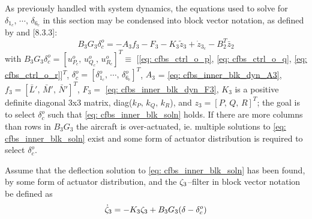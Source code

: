 \documentclass[12pt]{ucthesis}
\begin{document}
As previously handled with system dynamics, the equations used to solve for $\delta_{1_c},\,\cdots,\,\delta_{6_c}$ in this section may be condensed into block vector notation, as defined by \citet{Farrell2005} and \citet{Farrell2006}[8.3.3]:%
	\begin{equation} \label{eq: cfbs_inner_blk_soln}%
		B_3 G_3 \delta^o_{c} = -A_3 f_3 -F_3 -K_3{\tilde{z}_3} + \dot{z}_{3_c} - B^T_2\bar{z}_2
	\end{equation}
with $B_3 G_3 \delta^o_{c} = [u^{o}_{P_c},\,u^{o}_{Q_c},\,u^{o}_{R_c}]^T \equiv $ [\ref{eq: cfbs_ctrl_o_p}, \ref{eq: cfbs_ctrl_o_q}, \ref{eq: cfbs_ctrl_o_r}]$^T$, $\delta^o_{c} = [\delta^o_{1_c},\,\cdots,\,\delta^o_{6_c}]^T$, $A_3$ = \autoref{eq: cfbs_inner_blk_dyn_A3}, $f_3 = [\bar{L}',\,\bar{M}',\,\bar{N}']^T$, $F_3 =$ \autoref{eq: cfbs_inner_blk_dyn_F3}, $K_3$ is a positive definite diagonal 3x3 matrix, diag($k_P,\,k_Q,\,k_R$), and $z_3 = [P,\,Q,\,R]^T$; the goal is to select  $\delta^o_{c}$ such that \autoref{eq: cfbs_inner_blk_soln} holds. If there are more columns than rows in $B_3 G_3$ the aircraft is over-actuated, ie. multiple solutions to \autoref{eq: cfbs_inner_blk_soln} exist and some form of actuator distribution is required to select $\delta^o_{c}$.

Assume that the deflection solution to \autoref{eq: cfbs_inner_blk_soln} has been found, by some form of actuator distribution, and the $\zeta_3$--filter in block vector notation be defined as
	\begin{equation} \label{eq: cfbs_inner_blk_filt}
		\dot{\zeta}_3 = -K_3 \zeta_3 + B_3 G_3(\delta - \delta^o_{c})
	\end{equation}
\end{document}
